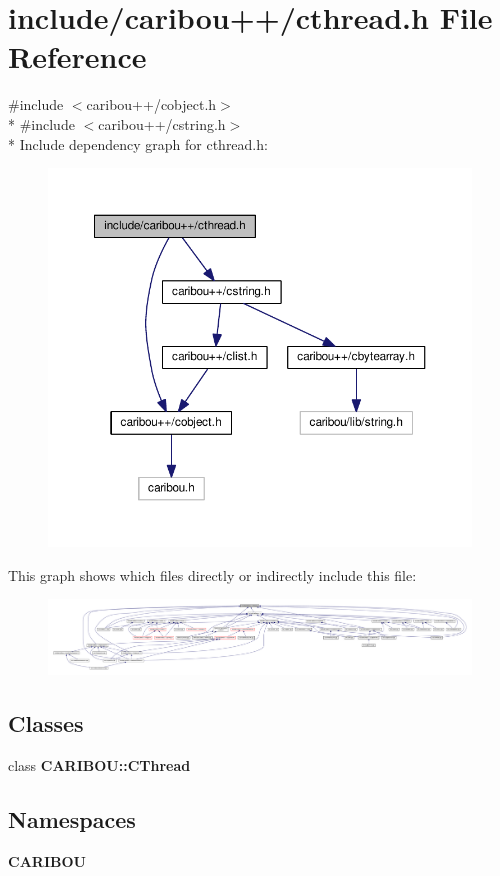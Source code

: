 \section{include/caribou++/cthread.h File Reference}
\label{cthread_8h}
{\ttfamily \#include $<$caribou++/cobject.\+h$>$}\\*
{\ttfamily \#include $<$caribou++/cstring.\+h$>$}\\*
Include dependency graph for cthread.\+h\+:
\nopagebreak
\begin{figure}[H]
\begin{center}
\leavevmode
\includegraphics[width=350pt]{cthread_8h__incl}
\end{center}
\end{figure}
This graph shows which files directly or indirectly include this file\+:
\nopagebreak
\begin{figure}[H]
\begin{center}
\leavevmode
\includegraphics[width=350pt]{cthread_8h__dep__incl}
\end{center}
\end{figure}
\subsection*{Classes}
\begin{DoxyCompactItemize}
\item 
class {\bf C\+A\+R\+I\+B\+O\+U\+::\+C\+Thread}
\end{DoxyCompactItemize}
\subsection*{Namespaces}
\begin{DoxyCompactItemize}
\item 
 {\bf C\+A\+R\+I\+B\+OU}
\end{DoxyCompactItemize}
